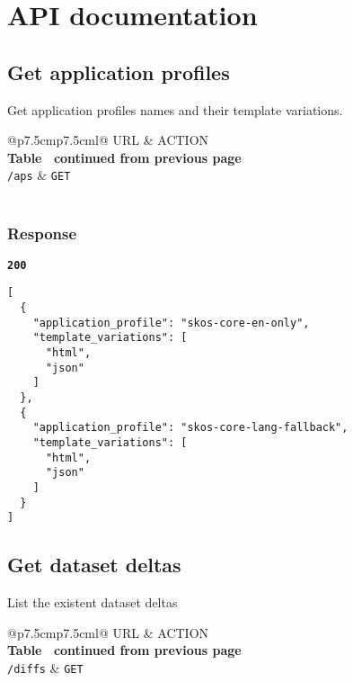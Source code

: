 \section{API documentation}

\subsection{Get application profiles}
Get application profiles names and their template variations.

\begin{longtable}[c]{@{}p{7.5cm}p{7.5cm}l@{}}
  \toprule
  URL           & ACTION                                      \\* \midrule
  \endfirsthead
  \multicolumn{3}{c}%
  {{\bfseries Table \thetable\ continued from previous page}} \\
  \endhead
  \bottomrule
  \endfoot
  \endlastfoot
  \texttt{/aps} & \texttt{GET}                                \\* \bottomrule
  \label{tab:rdf-differ-get-aps}                              \\
\end{longtable}

\subsubsection{Response}
\textbf{\texttt{200}}
\begin{lstlisting}
[
  {
    "application_profile": "skos-core-en-only",
    "template_variations": [
      "html",
      "json"
    ]
  },
  {
    "application_profile": "skos-core-lang-fallback",
    "template_variations": [
      "html",
      "json"
    ]
  }
]
\end{lstlisting}

\subsection{Get dataset deltas}
List the existent dataset deltas

\begin{longtable}[c]{@{}p{7.5cm}p{7.5cm}l@{}}
  \toprule
  URL             & ACTION                                    \\* \midrule
  \endfirsthead
  \multicolumn{3}{c}%
  {{\bfseries Table \thetable\ continued from previous page}} \\
  \endhead
  \bottomrule
  \endfoot
  \endlastfoot
  \texttt{/diffs} & \texttt{GET}                              \\* \bottomrule
  \label{tab:rdf-differ-get-diffs}                            \\
\end{longtable}

